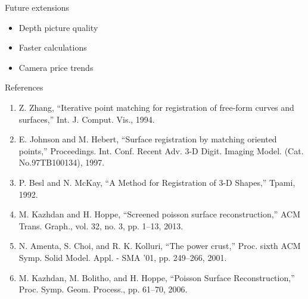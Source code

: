 \documentclass{beamer}
\begin{document}
\begin{frame}{Future extensions}

\begin{itemize}
	\item Depth picture quality
	\item Faster calculations
	\item Camera price trends
\end{itemize}
\end{frame}





\begin{frame}{References}
\begin{enumerate}
	\item Z. Zhang, “Iterative point matching for registration of free-form curves and surfaces,” Int. J. Comput. Vis., 1994.
	\item E. Johnson and M. Hebert, “Surface registration by matching oriented points,” Proceedings. Int. Conf. Recent Adv. 3-D Digit. Imaging Model. (Cat. No.97TB100134), 1997.
	\item  P. Besl and N. McKay, “A Method for Registration of 3-D Shapes,” Tpami, 1992.
	\item M. Kazhdan and H. Hoppe, “Screened poisson surface reconstruction,” ACM Trans. Graph., vol. 32, no. 3, pp. 1–13, 2013.
	\item N. Amenta, S. Choi, and R. K. Kolluri, “The power crust,” Proc. sixth ACM Symp. Solid Model. Appl. - SMA ’01, pp. 249–266, 2001.
	\item M. Kazhdan, M. Bolitho, and H. Hoppe, “Poisson Surface Reconstruction,” Proc. Symp. Geom. Process., pp. 61–70, 2006.
\end{enumerate}
\end{frame}




\end{document}
